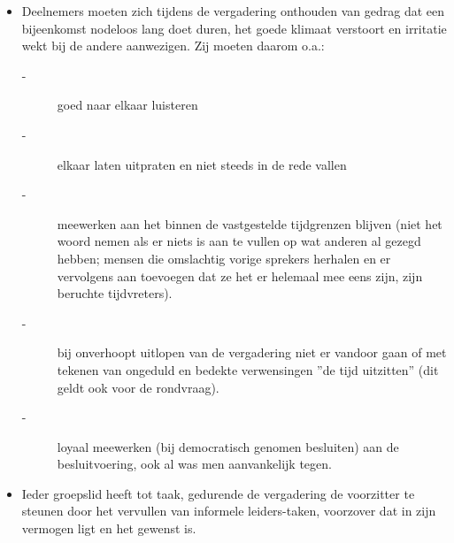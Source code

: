 \begin{itemize}
\item    Deelnemers moeten zich tijdens de vergadering onthouden
     van gedrag dat een bijeenkomst nodeloos lang doet duren,
     het goede klimaat verstoort en irritatie wekt bij de
     andere aanwezigen.
     Zij moeten daarom o.a.:
\begin{description}
     \item[-]    goed naar elkaar luisteren
     \item[-]    elkaar laten uitpraten en niet steeds in de rede
          vallen
     \item[-]    meewerken aan het binnen de vastgestelde tijdgrenzen
          blijven (niet het woord nemen als er niets is aan te
          vullen op wat anderen al gezegd hebben; mensen die
          omslachtig vorige sprekers herhalen en er vervolgens
          aan toevoegen dat ze het er helemaal mee eens zijn,
          zijn beruchte tijdvreters).
     \item[-]    bij onverhoopt uitlopen van de vergadering niet er
          vandoor gaan of met tekenen van ongeduld en bedekte
          verwensingen ''de tijd uitzitten'' (dit geldt ook voor
          de rondvraag).
     \item[-]    loyaal meewerken (bij democratisch genomen besluiten) aan de besluitvoering, ook al was men aanvankelijk tegen.
\end{description}
\item    Ieder groepslid heeft tot taak, gedurende de vergadering
     de voorzitter te steunen door het vervullen van informele
     leiders-taken, voorzover dat in zijn vermogen ligt en het
     gewenst is.
\end{itemize}

